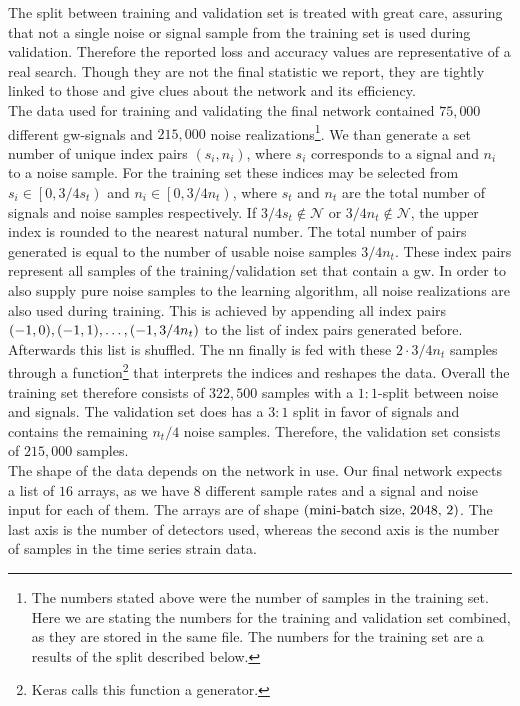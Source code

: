 The split between training and validation set is treated with great care, assuring that not a single noise or signal sample from the training set is used during validation. Therefore the reported loss and accuracy values are representative of a real search. Though they are not the final statistic we report, they are tightly linked to those and give clues about the network and its efficiency.\\
The data used for training and validating the final network contained $75,000$ different \gls{gw}-signals and $215,000$ noise realizations\footnote{The numbers stated above were the number of samples in the training set. Here we are stating the numbers for the training and validation set combined, as they are stored in the same file. The numbers for the training set are a results of the split described below.}. We than generate a set number of unique index pairs $(s_i, n_i)$, where $s_i$ corresponds to a signal and $n_i$ to a noise sample. For the training set these indices may be selected from $s_i\in\left[0, 3/4s_t\right)$ and $n_i\in\left[0, 3/4n_t\right)$, where $s_t$ and $n_t$ are the total number of signals and noise samples respectively. If $3/4s_t\notin\mathcal{N}$ or $3/4n_t\notin\mathcal{N}$, the upper index is rounded to the nearest natural number. The total number of pairs generated is equal to the number of usable noise samples $3/4 n_t$. These index pairs represent all samples of the training/validation set that contain a \gls{gw}. In order to also supply pure noise samples to the learning algorithm, all noise realizations are also used during training. This is achieved by appending all index pairs ${\left( -1, 0 \right)}, {\left( -1, 1 \right)}, \dotsc, {\left( -1, 3/4n_t \right)}$ to the list of index pairs generated before. Afterwards this list is shuffled. The \gls{nn} finally is fed with these $2\cdot 3/4 n_t$ samples through a function\footnote{Keras calls this function a generator.} that interprets the indices and reshapes the data. Overall the training set therefore consists of $322,500$ samples with a $1:1$-split between noise and signals. The validation set does has a $3:1$ split in favor of signals and contains the remaining $n_t / 4$ noise samples. Therefore, the validation set consists of $215,000$ samples.\\
The shape of the data depends on the network in use. Our final network expects a list of $16$ arrays, as we have $8$ different sample rates and a signal and noise input for each of them. The arrays are of shape ${\left( \text{mini-batch size, 2048, 2} \right)}$. The last axis is the number of detectors used, whereas the second axis is the number of samples in the time series strain data.\medskip\\
